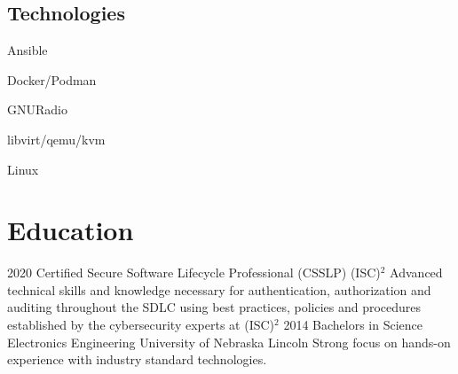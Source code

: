 \documentclass[]{src/friggeri-cv}
\begin{document}
\begin{aside}
  \section{Technologies}
    \item[\rightarrow]{Ansible}
    \item[\rightarrow]{Docker/Podman}
    \item[\rightarrow]{GNURadio}
    \item[\rightarrow]{libvirt/qemu/kvm}
    \item[\rightarrow]{Linux}
    ~
\end{aside}

\section{Education}
\begin{entrylist}
  \entry
    {2020}
    {Certified Secure Software Lifecycle Professional (CSSLP)}
    {(ISC)\color{pblue}\(^2\)}
    {Advanced technical skills and knowledge necessary for authentication, authorization and auditing throughout the SDLC using best practices, policies and procedures established by the cybersecurity experts at (ISC)\(^2\)}
  \entry
    {2014}
    {Bachelors in Science Electronics Engineering}
    {University of Nebraska Lincoln}
    {Strong focus on hands-on experience with industry standard technologies.}
\end{entrylist}
\end{document}

